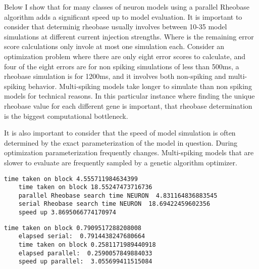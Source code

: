   

    
    Below I show that for many classes of neuron models using a parallel
Rheobase algorithm adds a significant speed up to model evaluation. It
is important to consider that determinig rheobase usually involves
between 10-35 model simulations at different current injection
strengths. Where is the remaining error score calculations only invole
at most one simulation each. Consider an optimization problem where
there are only eight error scores to calculate, and four of the eight
errors are for non spiking simulations of less than 500ms, a rheobase
simulation is for 1200ms, and it involves both non-spiking and
multi-spiking behavior. Multi-spiking models take longer to simulate
than non spiking models for technical reasons. In this particular
instance where finding the unique rheobase value for each different gene
is important, that rheobase determination is the biggest computational
bottleneck.

It is also important to consider that the speed of model simulation is
often determined by the exact parameterization of the model in question.
During optimization parameterization frequently changes. Multi-spiking
models that are slower to evaluate are frequently sampled by a genetic
algorithm optimizer.

\begin{Verbatim}[commandchars=\\\{\}]
    time taken on block 4.555711984634399
    time taken on block 18.55247473716736
    parallel Rheobase search time NEURON  4.831164836883545
    serial Rheobase search time NEURON  18.69422459602356
    speed up 3.8695066774170974
\end{Verbatim}

\begin{Verbatim}[commandchars=\\\{\}]
    time taken on block 0.7909517288208008
    elapsed serial:  0.7914438247680664
    time taken on block 0.2581171989440918
    elapsed parallel:  0.2590057849884033
    speed up parallel:  3.055699411515084
\end{Verbatim}


    
